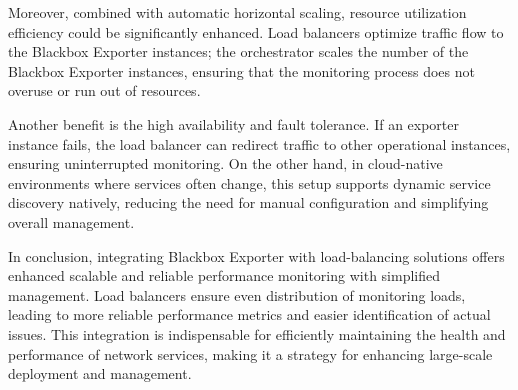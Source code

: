 Moreover, combined with automatic horizontal scaling, resource utilization efficiency could be significantly enhanced. Load balancers optimize traffic flow to the Blackbox Exporter instances; the orchestrator scales the number of the Blackbox Exporter instances, ensuring that the monitoring process does not overuse or run out of resources. 

Another benefit is the high availability and fault tolerance. If an exporter instance fails, the load balancer can redirect traffic to other operational instances, ensuring uninterrupted monitoring. On the other hand, in cloud-native environments where services often change, this setup supports dynamic service discovery natively, reducing the need for manual configuration and simplifying overall management. 

In conclusion, integrating Blackbox Exporter with load-balancing solutions offers enhanced scalable and reliable performance monitoring with simplified management. Load balancers ensure even distribution of monitoring loads, leading to more reliable performance metrics and easier identification of actual issues. This integration is indispensable for efficiently maintaining the health and performance of network services, making it a strategy for enhancing large-scale deployment and management.
